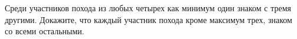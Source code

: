 \documentclass{article}
\begin{document}
Среди участников похода из любых четырех как минимум один знаком с тремя другими. Докажите, что каждый участник похода 
кроме максимум трех, знаком со всеми остальными.
\end{document}

